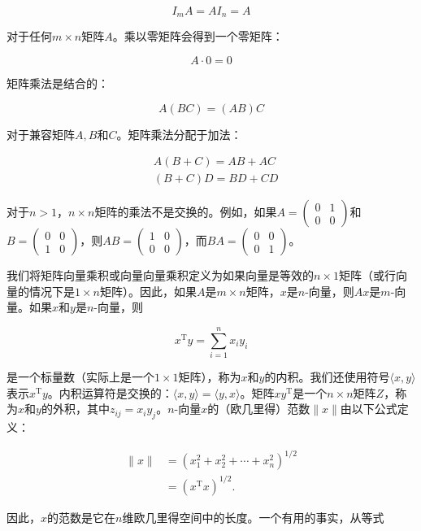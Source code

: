 \documentclass[lang=cn,newtx,10pt,scheme=chinese]{elegantbook}
\begin{document}
$$
I_m A=A I_n=A
$$

对于任何$m \times n$矩阵$A$。乘以零矩阵会得到一个零矩阵：

$$
A \cdot 0=0
$$

矩阵乘法是结合的：

$$
A(B C)=(A B) C
$$

对于兼容矩阵$A, B$和$C$。矩阵乘法分配于加法：

$$
\begin{aligned}
& A(B+C)=A B+A C \\
& (B+C) D=B D+C D
\end{aligned}
$$

对于$n>1$，$n \times n$矩阵的乘法不是交换的。例如，如果$A=\left(\begin{array}{ll}0 & 1 \\ 0 & 0\end{array}\right)$和$B=\left(\begin{array}{ll}0 & 0 \\ 1 & 0\end{array}\right)$，则$A B=\left(\begin{array}{ll}1 & 0 \\ 0 & 0\end{array}\right)$，而$B A=\left(\begin{array}{ll}0 & 0 \\ 0 & 1\end{array}\right)$。

我们将矩阵向量乘积或向量向量乘积定义为如果向量是等效的$n \times 1$矩阵（或行向量的情况下是$1 \times n$矩阵）。因此，如果$A$是$m \times n$矩阵，$x$是$n$-向量，则$A x$是$m$-向量。如果$x$和$y$是$n$-向量，则

$$
x^{\mathrm{T}} y=\sum_{i=1}^n x_i y_i
$$

是一个标量数（实际上是一个$1 \times 1$矩阵），称为$x$和$y$的内积。我们还使用符号$\langle x, y\rangle$表示$x^{\mathrm{T}} y$。内积运算符是交换的：$\langle x, y\rangle=\langle y, x\rangle$。矩阵$x y^{\mathrm{T}}$是一个$n \times n$矩阵$Z$，称为$x$和$y$的外积，其中$z_{i j}=x_i y_j$。$n$-向量$x$的（欧几里得）范数$\|x\|$由以下公式定义：

$$
\begin{aligned}
\|x\| & =\left(x_1^2+x_2^2+\cdots+x_n^2\right)^{1 / 2} \\
& =\left(x^{\mathrm{T}} x\right)^{1 / 2} .
\end{aligned}
$$

因此，$x$的范数是它在$n$维欧几里得空间中的长度。一个有用的事实，从等式
\end{document}
